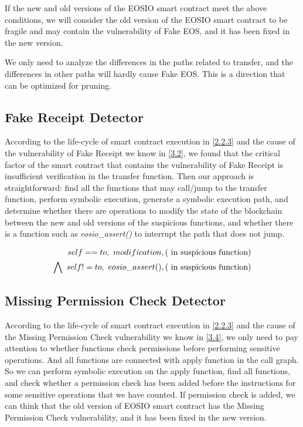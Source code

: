 \documentclass[a4paper, 10pt, conference, twocolumn]{ieeeconf}       %
\begin{document}
If the new and old versions of the EOSIO smart contract meet the above conditions,
we will consider the old version of the EOSIO smart contract to be fragile and may contain the vulnerability of Fake EOS,
and it has been fixed in the new version.

We only need to analyze the differences in the paths related to transfer,
and the differences in other paths will hardly cause Fake EOS.
This is a direction that can be optimized for pruning.

\subsection{Fake Receipt Detector}
According to the life-cycle of smart contract execution in \ref{2.2.3} and the cause of the vulnerability of Fake Receipt we know in \ref{3.2},
we found that the critical factor of the smart contract that contains the vulnerability of Fake Receipt is insufficient verification in the transfer function.
Then our approach is straightforward: find all the functions that may call/jump to the transfer function,
perform symbolic execution, generate a symbolic execution path,
and determine whether there are operations to modify the state of the blockchain between the new and old versions of the suspicious functions,
and whether there is a function such as \emph{eosio\_assert()} to interrupt the path that does not jump.

\begin{equation}
\begin{aligned}
self==to,~modification,(\rm~in~suspicious~function) \\
\bigwedge~self!=to,~eosio\_assert(),(\rm~in~suspicious~function) 
\end{aligned}
\end{equation}

\subsection{Missing Permission Check Detector}

According to the life-cycle of smart contract execution in \ref{2.2.3} and the cause of the Missing Permission Check vulnerability we know in \ref{3.4},
we only need to pay attention to whether functions check permissions before performing sensitive operations.
And all functions are connected with apply function in the call graph.
So we can perform symbolic execution on the apply function,
find all functions, and check whether a permission check has been added before the instructions for some sensitive operations that we have counted.
If permission check is added,
we can think that the old version of EOSIO smart contract has the Missing Permission Check vulnerability,
and it has been fixed in the new version.
\end{document}
